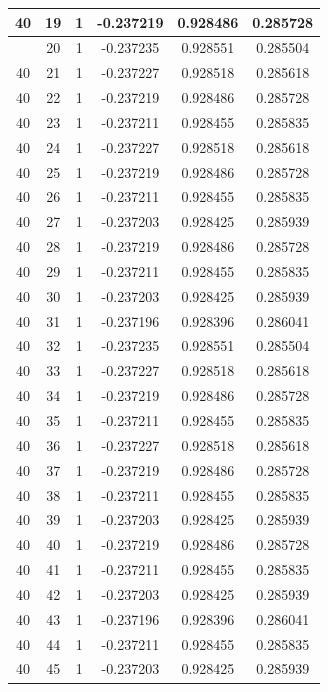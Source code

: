 \documentclass[12pt,a4paper]{article}
\numberwithin{equation}{section}
\numberwithin{figure}{section}
\numberwithin{table}{section}
\begin{document}
\begin{longtable}{|c|c|c|c|c|c|}
40 & 19 & 1 & -0.237219 & 0.928486 & 0.285728 \\ \hline
\pagebreak
40 & 20 & 1 & -0.237235 & 0.928551 & 0.285504 \\ \hline
40 & 21 & 1 & -0.237227 & 0.928518 & 0.285618 \\ \hline
40 & 22 & 1 & -0.237219 & 0.928486 & 0.285728 \\ \hline
40 & 23 & 1 & -0.237211 & 0.928455 & 0.285835 \\ \hline
40 & 24 & 1 & -0.237227 & 0.928518 & 0.285618 \\ \hline
40 & 25 & 1 & -0.237219 & 0.928486 & 0.285728 \\ \hline
40 & 26 & 1 & -0.237211 & 0.928455 & 0.285835 \\ \hline
40 & 27 & 1 & -0.237203 & 0.928425 & 0.285939 \\ \hline
40 & 28 & 1 & -0.237219 & 0.928486 & 0.285728 \\ \hline
40 & 29 & 1 & -0.237211 & 0.928455 & 0.285835 \\ \hline
40 & 30 & 1 & -0.237203 & 0.928425 & 0.285939 \\ \hline
40 & 31 & 1 & -0.237196 & 0.928396 & 0.286041 \\ \hline
40 & 32 & 1 & -0.237235 & 0.928551 & 0.285504 \\ \hline
40 & 33 & 1 & -0.237227 & 0.928518 & 0.285618 \\ \hline
40 & 34 & 1 & -0.237219 & 0.928486 & 0.285728 \\ \hline
40 & 35 & 1 & -0.237211 & 0.928455 & 0.285835 \\ \hline
40 & 36 & 1 & -0.237227 & 0.928518 & 0.285618 \\ \hline
40 & 37 & 1 & -0.237219 & 0.928486 & 0.285728 \\ \hline
40 & 38 & 1 & -0.237211 & 0.928455 & 0.285835 \\ \hline
40 & 39 & 1 & -0.237203 & 0.928425 & 0.285939 \\ \hline
40 & 40 & 1 & -0.237219 & 0.928486 & 0.285728 \\ \hline
40 & 41 & 1 & -0.237211 & 0.928455 & 0.285835 \\ \hline
40 & 42 & 1 & -0.237203 & 0.928425 & 0.285939 \\ \hline
40 & 43 & 1 & -0.237196 & 0.928396 & 0.286041 \\ \hline
40 & 44 & 1 & -0.237211 & 0.928455 & 0.285835 \\ \hline
40 & 45 & 1 & -0.237203 & 0.928425 & 0.285939 \\ \hline

\end{longtable}
\end{document}
